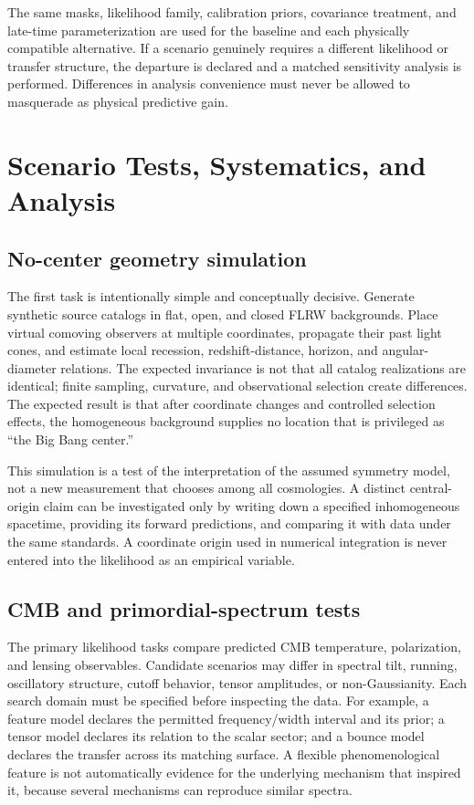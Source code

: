 \documentclass[10pt,conference]{IEEEtran}
\begin{document}
The same masks, likelihood family, calibration priors, covariance treatment, and late-time parameterization are used for the baseline and each physically compatible alternative. If a scenario genuinely requires a different likelihood or transfer structure, the departure is declared and a matched sensitivity analysis is performed. Differences in analysis convenience must never be allowed to masquerade as physical predictive gain.

\section{Scenario Tests, Systematics, and Analysis}
\label{sec:analysis}

\subsection{No-center geometry simulation}

The first task is intentionally simple and conceptually decisive. Generate synthetic source catalogs in flat, open, and closed FLRW backgrounds. Place virtual comoving observers at multiple coordinates, propagate their past light cones, and estimate local recession, redshift-distance, horizon, and angular-diameter relations. The expected invariance is not that all catalog realizations are identical; finite sampling, curvature, and observational selection create differences. The expected result is that after coordinate changes and controlled selection effects, the homogeneous background supplies no location that is privileged as ``the Big Bang center.''

This simulation is a test of the interpretation of the assumed symmetry model, not a new measurement that chooses among all cosmologies. A distinct central-origin claim can be investigated only by writing down a specified inhomogeneous spacetime, providing its forward predictions, and comparing it with data under the same standards. A coordinate origin used in numerical integration is never entered into the likelihood as an empirical variable.

\subsection{CMB and primordial-spectrum tests}

The primary likelihood tasks compare predicted CMB temperature, polarization, and lensing observables. Candidate scenarios may differ in spectral tilt, running, oscillatory structure, cutoff behavior, tensor amplitudes, or non-Gaussianity. Each search domain must be specified before inspecting the data. For example, a feature model declares the permitted frequency/width interval and its prior; a tensor model declares its relation to the scalar sector; and a bounce model declares the transfer across its matching surface. A flexible phenomenological feature is not automatically evidence for the underlying mechanism that inspired it, because several mechanisms can reproduce similar spectra.
\end{document}
